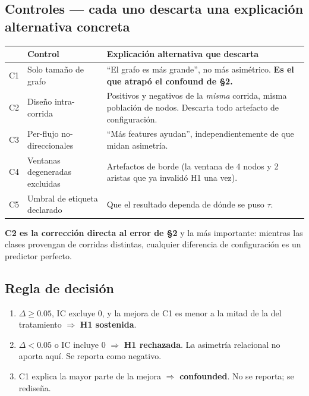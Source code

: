 \documentclass[11pt]{article}
\begin{document}
\subsection{Controles --- cada uno descarta una explicación alternativa concreta}

\begin{center}
\begin{tabular}{clp{7.4cm}}
\toprule
& \textbf{Control} & \textbf{Explicación alternativa que descarta} \\
\midrule
C1 & Solo tamaño de grafo & ``El grafo es más grande'', no más asimétrico. \cellcolor{crit!8}\textbf{Es el que atrapó el confound de \S2.} \\
C2 & Diseño intra-corrida & Positivos y negativos de la \emph{misma} corrida, misma población de nodos. Descarta todo artefacto de configuración. \\
C3 & Per-flujo no-direccionales & ``Más features ayudan'', independientemente de que midan asimetría. \\
C4 & Ventanas degeneradas excluidas & Artefactos de borde (la ventana de 4 nodos y 2 aristas que ya invalidó H1 una vez). \\
C5 & Umbral de etiqueta declarado & Que el resultado dependa de dónde se puso $\tau$. \\
\bottomrule
\end{tabular}
\end{center}

\textbf{C2 es la corrección directa al error de \S2} y la más importante: mientras las clases provengan de corridas distintas, cualquier diferencia de configuración es un predictor perfecto.

\subsection{Regla de decisión}

\begin{enumerate}[leftmargin=1.5em,itemsep=1pt]
  \item $\Delta \ge 0.05$, IC excluye $0$, y la mejora de C1 es menor a la mitad de la del tratamiento $\Rightarrow$ \textbf{H1 sostenida}.
  \item $\Delta < 0.05$ o IC incluye $0$ $\Rightarrow$ \textbf{H1 rechazada}. La asimetría relacional no aporta aquí. Se reporta como negativo.
  \item C1 explica la mayor parte de la mejora $\Rightarrow$ \textbf{confounded}. No se reporta; se rediseña.
\end{enumerate}
\end{document}
